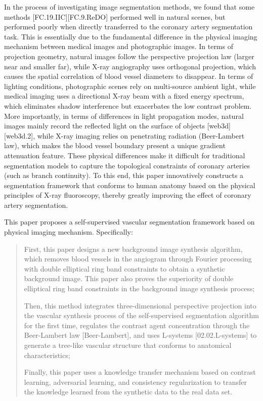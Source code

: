 
In the process of investigating image segmentation methods, we found that some methods [FC.19.IIC][FC.9.ReDO] performed well in natural scenes, but performed poorly when directly transferred to the coronary artery segmentation task. This is essentially due to the fundamental difference in the physical imaging mechanism between medical images and photographic images. In terms of projection geometry, natural images follow the perspective projection law (larger near and smaller far), while X-ray angiography uses orthogonal projection, which causes the spatial correlation of blood vessel diameters to disappear. In terms of lighting conditions, photographic scenes rely on multi-source ambient light, while medical imaging uses a directional X-ray beam with a fixed energy spectrum, which eliminates shadow interference but exacerbates the low contrast problem. More importantly, in terms of differences in light propagation modes, natural images mainly record the reflected light on the surface of objects [web3d][web3d.2], while X-ray imaging relies on penetrating radiation (Beer-Lambert law), which makes the blood vessel boundary present a unique gradient attenuation feature. These physical differences make it difficult for traditional segmentation models to capture the topological constraints of coronary arteries (such as branch continuity). To this end, this paper innovatively constructs a segmentation framework that conforms to human anatomy based on the physical principles of X-ray fluoroscopy, thereby greatly improving the effect of coronary artery segmentation.


This paper proposes a self-supervised vascular segmentation framework based on physical imaging mechanism. Specifically: 
\begin{quotation}
  \noindent
First, this paper designs a new background image synthesis algorithm, which removes blood vessels in the angiogram through Fourier processing with double elliptical ring band constraints to obtain a synthetic background image. This paper also proves the superiority of double elliptical ring band constraints in the background image synthesis process; 

Then, this method integrates three-dimensional perspective projection into the vascular synthesis process of the self-supervised segmentation algorithm for the first time, regulates the contrast agent concentration through the Beer-Lambert law [Beer-Lambert], and uses L-systems [02.02.L-systems] to generate a tree-like vascular structure that conforms to anatomical characteristics; 

Finally, this paper uses a knowledge transfer mechanism based on contrast learning, adversarial learning, and consistency regularization to transfer the knowledge learned from the synthetic data to the real data set. 
\end{quotation}

